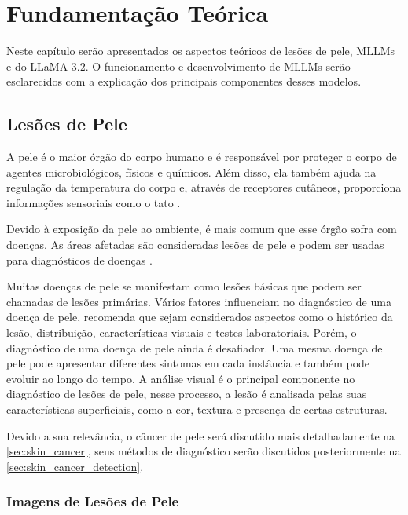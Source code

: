 
\chapter{Fundamentação Teórica}

Neste capítulo serão apresentados os aspectos teóricos de lesões de pele, \acp{MLLM} e do \ac{LLaMA}-3.2. O
funcionamento e desenvolvimento de \acp{MLLM} serão esclarecidos com a explicação dos principais componentes desses
modelos.

\section{Lesões de Pele}

A pele é o maior órgão do corpo humano e é responsável por proteger o corpo de agentes microbiológicos, físicos e
químicos. Além disso, ela também ajuda na regulação da temperatura do corpo e, através de receptores cutâneos,
proporciona informações sensoriais como o tato \cite{skin}.

Devido à exposição da pele ao ambiente, é mais comum que esse órgão sofra com doenças. As áreas afetadas são
consideradas lesões de pele e podem ser usadas para diagnósticos de doenças \cite{segmentation_skin_lesions}.

Muitas doenças de pele se manifestam como lesões básicas que podem ser chamadas de lesões primárias. Vários fatores
influenciam no diagnóstico de uma doença de pele, \textcite{habif2015clinical} recomenda que sejam considerados
aspectos como o histórico da lesão, distribuição, características visuais e testes laboratoriais. Porém, o diagnóstico
de uma doença de pele ainda é desafiador. Uma mesma doença de pele pode apresentar diferentes sintomas em cada
instância e também pode evoluir ao longo do tempo. A análise visual é o principal componente no diagnóstico de lesões
de pele, nesse processo, a lesão é analisada pelas suas características superficiais, como a cor, textura e presença de
certas estruturas.

Devido a sua relevância, o câncer de pele será discutido mais detalhadamente na \autoref{sec:skin_cancer}, seus métodos
de diagnóstico serão discutidos posteriormente na \autoref{sec:skin_cancer_detection}.

\subsection{Imagens de Lesões de Pele} \label{sec:skin_lesion_images}

